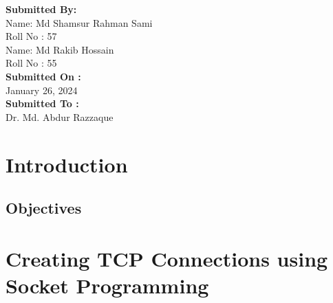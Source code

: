 \documentclass[11pt]{article}
\begin{document}
\begin{titlepage}
    \begin{large}
        \textbf{Submitted By:\\[12pt]}
            Name: Md Shamsur Rahman Sami\\[5pt]
            Roll No : 57\\[7pt]
            Name: Md Rakib Hossain\\[5pt]
            Roll No : 55\\[12pt]
        \textbf{Submitted On : \\[12pt]}
            January 26, 2024\\[20pt]
        \textbf{Submitted To :\\[12pt]}
            Dr. Md. Abdur Razzaque\\[12pt]
    \end{large}
\end{titlepage}

\tableofcontents  

\newpage

\section{Introduction}
\subsection{Objectives}

\section*{Creating TCP Connections using Socket Programming}
\end{document}
